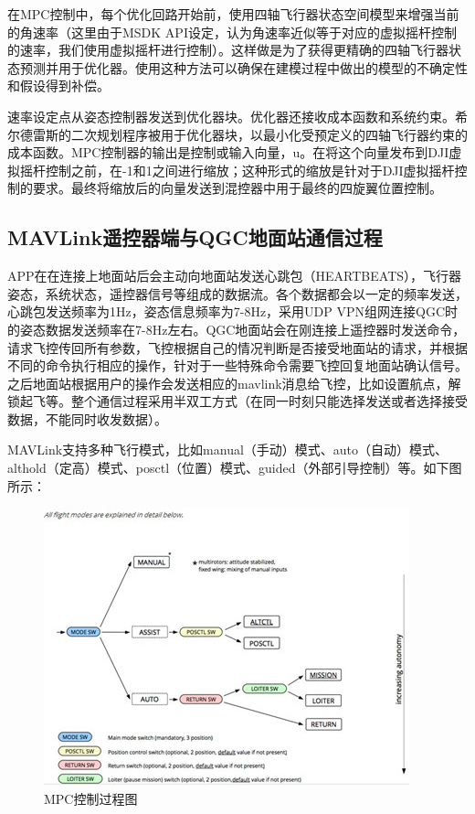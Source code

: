 在MPC控制中，每个优化回路开始前，使用四轴飞行器状态空间模型来增强当前的角速率（这里由于MSDK API设定，认为角速率近似等于对应的虚拟摇杆控制的速率，我们使用虚拟摇杆进行控制）。这样做是为了获得更精确的四轴飞行器状态预测并用于优化器。使用这种方法可以确保在建模过程中做出的模型的不确定性和假设得到补偿。

速率设定点从姿态控制器发送到优化器块。优化器还接收成本函数和系统约束。希尔德雷斯的二次规划程序被用于优化器块，以最小化受预定义的四轴飞行器约束的成本函数。MPC控制器的输出是控制或输入向量，u。在将这个向量发布到DJI虚拟摇杆控制之前，在-1和1之间进行缩放；这种形式的缩放是针对于DJI虚拟摇杆控制的要求。最终将缩放后的向量发送到混控器中用于最终的四旋翼位置控制。

\subsection{MAVLink遥控器端与QGC地面站通信过程}

APP在在连接上地面站后会主动向地面站发送心跳包（HEARTBEATS），飞行器姿态，系统状态，遥控器信号等组成的数据流。各个数据都会以一定的频率发送，心跳包发送频率为1Hz，姿态信息频率为7-8Hz，采用UDP VPN组网连接QGC时的姿态数据发送频率在7-8Hz左右。QGC地面站会在刚连接上遥控器时发送命令，请求飞控传回所有参数，飞控根据自己的情况判断是否接受地面站的请求，并根据不同的命令执行相应的操作，针对于一些特殊命令需要飞控回复地面站确认信号。之后地面站根据用户的操作会发送相应的mavlink消息给飞控，比如设置航点，解锁起飞等。整个通信过程采用半双工方式（在同一时刻只能选择发送或者选择接受数据，不能同时收发数据）。

MAVLink支持多种飞行模式，比如manual（手动）模式、auto（自动）模式、althold（定高）模式、posctl（位置）模式、guided（外部引导控制）等。如下图所示：

\begin{figure}[ht]
  \centering
  \includegraphics[width=0.8\linewidth]{./Figure/Flight_Mode.png}
  \caption{MPC控制过程图}\label{Fig:xd1}
\end{figure}

